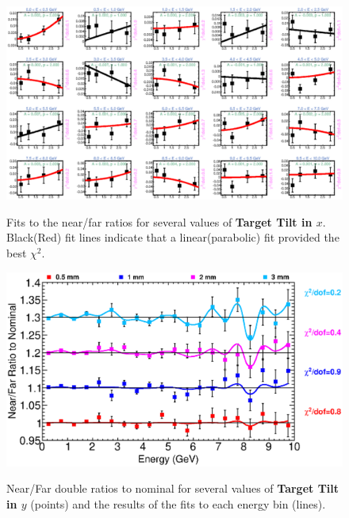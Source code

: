 {\begin{figure}[ht]
  \begin{center}
    {\includegraphics[width=5.0in]{figures/TargetXTilt_nof_fits.eps}}
  \end{center}
\caption{ Fits to the near/far ratios for several values of {\bf Target Tilt in $x$}. Black(Red) fit lines indicate that a linear(parabolic) fit provided the best $\chi^2$. }
\end{figure}

\clearpage

\begin{figure}[ht]
  \begin{center}
    {\includegraphics[width=6.0in]{figures/TargetYTilt_nof_summary.eps}}
  \end{center}
\caption{ Near/Far double ratios to nominal for several values of {\bf Target Tilt in $y$} (points) and the results of the fits to each energy bin (lines).}
\end{figure}

}
